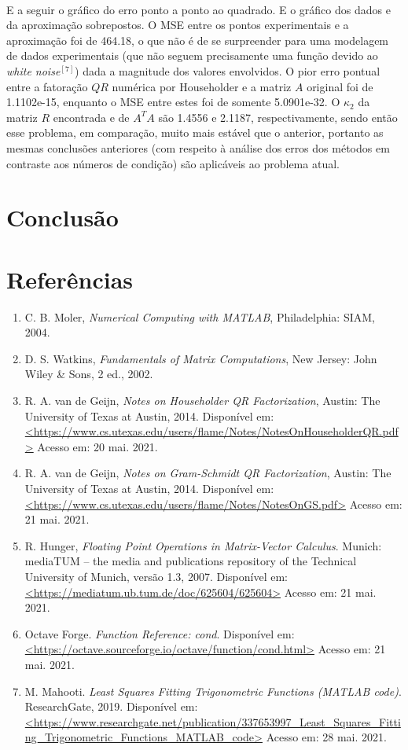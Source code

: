 \documentclass[a4paper, 12pt]{article}
\begin{document}
\\
E a seguir o gráfico do erro ponto a ponto ao quadrado.
E o gráfico dos dados e da aproximação sobrepostos.
O MSE entre os pontos experimentais e a aproximação foi de 464.18, o que não é de se surpreender para uma modelagem de dados experimentais (que não seguem precisamente uma função devido ao \textit{white noise}$^{[7]}$) dada a magnitude dos valores envolvidos. O pior erro pontual entre a fatoração $QR$ numérica por Householder e a matriz $A$ original foi de 1.1102e-15, enquanto o MSE entre estes foi de somente 5.0901e-32. O $\kappa_2$ da matriz $R$ encontrada e de $A^TA$ são 1.4556 e 2.1187, respectivamente, sendo então esse problema, em comparação, muito mais estável que o anterior, portanto as mesmas conclusões anteriores (com respeito à análise dos erros dos métodos em contraste aos números de condição) são aplicáveis ao problema atual. 
\section{Conclusão}


\section{Referências}
\begin{enumerate}
\sloppy
\item C. B. Moler, \textit{Numerical Computing with MATLAB}, Philadelphia: SIAM, 2004.
\item D. S. Watkins, \textit{Fundamentals of Matrix Computations}, New Jersey: John Wiley \& Sons, 2 ed., 2002.
\item R. A. van de Geijn, \textit{Notes on Householder QR Factorization}, Austin: The University of Texas at Austin, 2014. Disponível em: \url{<https://www.cs.utexas.edu/users/flame/Notes/NotesOnHouseholderQR.pdf>} Acesso em: 20 mai. 2021.
\item R. A. van de Geijn, \textit{Notes on Gram-Schmidt QR Factorization}, Austin: The University of Texas at Austin, 2014. Disponível em: \url{<https://www.cs.utexas.edu/users/flame/Notes/NotesOnGS.pdf>} Acesso em: 21 mai. 2021.
\item R. Hunger, \textit{Floating Point Operations in Matrix-Vector Calculus}. Munich: mediaTUM – the media and publications repository of the Technical University of Munich, versão 1.3, 2007. Disponível em: \url{<https://mediatum.ub.tum.de/doc/625604/625604>} Acesso em: 21 mai. 2021.
\item Octave Forge. \textit{Function Reference: cond}. Disponível em: \url{<https://octave.sourceforge.io/octave/function/cond.html>} Acesso em: 21 mai. 2021.
\item M. Mahooti. \textit{Least Squares Fitting Trigonometric Functions (MATLAB code)}. ResearchGate, 2019. Disponível em: \url{<https://www.researchgate.net/publication/337653997_Least_Squares_Fitting_Trigonometric_Functions_MATLAB_code>} Acesso em: 28 mai. 2021.
\end{enumerate}
\end{document}
